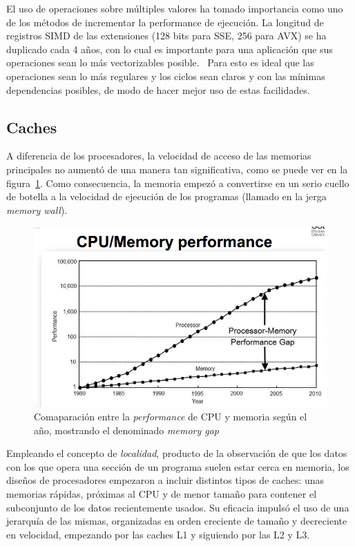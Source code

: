 El uso de operaciones sobre m\'ultiples valores ha tomado importancia como uno de los m\'etodos de incrementar
la performance de ejecuci\'on. La longitud de registros SIMD de las extensiones (128 bits para SSE, 256 para AVX)
se ha duplicado cada 4 a\~nos, con lo cual es importante para una aplicaci\'on que sus operaciones sean lo m\'as
vectorizables posible.~\cite{HennessyPatterson} Para esto es ideal que las operaciones sean lo m\'as regulares y
los ciclos sean claros y con las m\'inimas dependencias posibles, de modo de hacer mejor uso de estas facilidades.

\subsection{Caches}

A diferencia de los procesadores, la velocidad de acceso de las memorias principales no aument\'o de una manera
tan significativa, como se puede ver en la figura~\ref{fig:cpu_vs_mem}. Como consecuencia, la memoria
empez\'o a convertirse en un serio cuello de botella a la velocidad de ejecuci\'on de los programas (llamado
en la jerga \textit{memory wall}).

\begin{figure}[htbp]
    \centering
    \includegraphics[width=\plotwidth]{images/cpu_vs_memory.png}
    \caption{Comaparaci\'on entre la \textit{performance} de CPU y memoria seg\'un el a\~no, mostrando
    el denominado \textit{memory gap}}
    \label{fig:cpu_vs_mem}
\end{figure}

Empleando el concepto de \textit{localidad}, producto de la observaci\'on de que los datos con los que opera una
secci\'on de un programa suelen estar cerca en memoria, los dise\~nos de procesadores empezaron a incluir distintos
tipos de caches: unas memorias r\'apidas, pr\'oximas al CPU y de menor tama\~no para contener el subconjunto de los datos
recientemente usados. Su eficacia impuls\'o el uso de una jerarqu\'ia de las mismas, organizadas en orden creciente
de tama\~no y decreciente en velocidad, empezando por las caches L1 y siguiendo por las L2 y L3.


